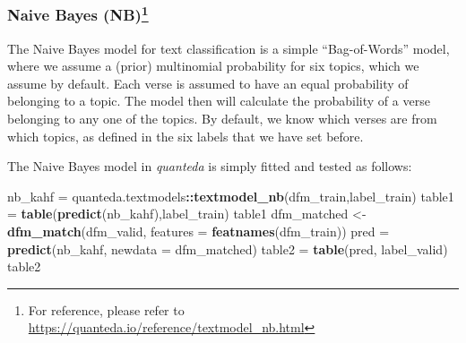 \documentclass[
]{article}
\newenvironment{Shaded}{\begin{snugshade}}{\end{snugshade}}
\newcommand{\AttributeTok}[1]{\textcolor[rgb]{0.13,0.29,0.53}{#1}}
\newcommand{\FunctionTok}[1]{\textcolor[rgb]{0.13,0.29,0.53}{\textbf{#1}}}
\newcommand{\NormalTok}[1]{#1}
\newcommand{\OtherTok}[1]{\textcolor[rgb]{0.56,0.35,0.01}{#1}}
\newcommand{\SpecialCharTok}[1]{\textcolor[rgb]{0.81,0.36,0.00}{\textbf{#1}}}
\begin{document}
\begin{Shaded}
\end{Shaded}

\normalsize

\hypertarget{naive-bayes-nb}{%
\subsubsection[Naive Bayes (NB)]{\texorpdfstring{Naive Bayes (NB)\footnote{For reference, please refer to \url{https://quanteda.io/reference/textmodel_nb.html}}}{Naive Bayes (NB)}}\label{naive-bayes-nb}}

The Naive Bayes model for text classification is a simple ``Bag-of-Words'' model, where we assume a (prior) multinomial probability for six topics, which we assume by default. Each verse is assumed to have an equal probability of belonging to a topic. The model then will calculate the probability of a verse belonging to any one of the topics. By default, we know which verses are from which topics, as defined in the six labels that we have set before.

The Naive Bayes model in \emph{quanteda} is simply fitted and tested as follows:

\footnotesize

\begin{Shaded}
\begin{Highlighting}[]
\NormalTok{nb\_kahf }\OtherTok{=}\NormalTok{ quanteda.textmodels}\SpecialCharTok{::}\FunctionTok{textmodel\_nb}\NormalTok{(dfm\_train,label\_train)}
\NormalTok{table1 }\OtherTok{=} \FunctionTok{table}\NormalTok{(}\FunctionTok{predict}\NormalTok{(nb\_kahf),label\_train)}
\NormalTok{table1}
\NormalTok{dfm\_matched }\OtherTok{\textless{}{-}} \FunctionTok{dfm\_match}\NormalTok{(dfm\_valid, }\AttributeTok{features =} \FunctionTok{featnames}\NormalTok{(dfm\_train))}
\NormalTok{pred }\OtherTok{=} \FunctionTok{predict}\NormalTok{(nb\_kahf, }\AttributeTok{newdata =}\NormalTok{ dfm\_matched)}
\NormalTok{table2 }\OtherTok{=} \FunctionTok{table}\NormalTok{(pred, label\_valid)}
\NormalTok{table2}
\end{Highlighting}
\end{Shaded}
\end{document}
